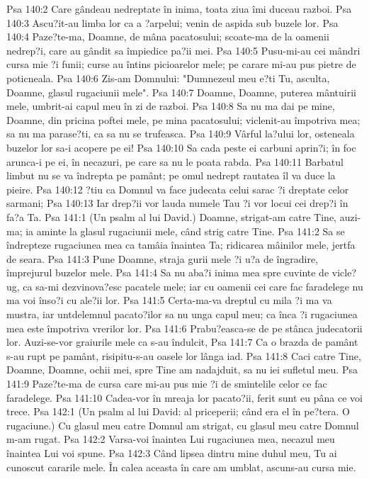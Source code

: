 Psa 140:2  Care gândeau nedreptate în inima, toata ziua îmi duceau razboi.
Psa 140:3  Ascu?it-au limba lor ca a ?arpelui; venin de aspida sub buzele lor.
Psa 140:4  Paze?te-ma, Doamne, de mâna pacatosului; scoate-ma de la oamenii nedrep?i, care au gândit sa împiedice pa?ii mei.
Psa 140:5  Pusu-mi-au cei mândri cursa mie ?i funii; curse au întins picioarelor mele; pe carare mi-au pus pietre de poticneala.
Psa 140:6  Zis-am Domnului: "Dumnezeul meu e?ti Tu, asculta, Doamne, glasul rugaciunii mele".
Psa 140:7  Doamne, Doamne, puterea mântuirii mele, umbrit-ai capul meu în zi de razboi.
Psa 140:8  Sa nu ma dai pe mine, Doamne, din pricina poftei mele, pe mina pacatosului; viclenit-au împotriva mea; sa nu ma parase?ti, ca sa nu se trufeasca.
Psa 140:9  Vârful la?ului lor, osteneala buzelor lor sa-i acopere pe ei!
Psa 140:10  Sa cada peste ei carbuni aprin?i; în foc arunca-i pe ei, în necazuri, pe care sa nu le poata rabda.
Psa 140:11  Barbatul limbut nu se va îndrepta pe pamânt; pe omul nedrept rautatea îl va duce la pieire.
Psa 140:12  ?tiu ca Domnul va face judecata celui sarac ?i dreptate celor sarmani;
Psa 140:13  Iar drep?ii vor lauda numele Tau ?i vor locui cei drep?i în fa?a Ta.
Psa 141:1  (Un psalm al lui David.) Doamne, strigat-am catre Tine, auzi-ma; ia aminte la glasul rugaciunii mele, când strig catre Tine.
Psa 141:2  Sa se îndrepteze rugaciunea mea ca tamâia înaintea Ta; ridicarea mâinilor mele, jertfa de seara.
Psa 141:3  Pune Doamne, straja gurii mele ?i u?a de îngradire, împrejurul buzelor mele.
Psa 141:4  Sa nu aba?i inima mea spre cuvinte de vicle?ug, ca sa-mi dezvinova?esc pacatele mele; iar cu oamenii cei care fac faradelege nu ma voi înso?i cu ale?ii lor.
Psa 141:5  Certa-ma-va dreptul cu mila ?i ma va mustra, iar untdelemnul pacato?ilor sa nu unga capul meu; ca înca ?i rugaciunea mea este împotriva vrerilor lor.
Psa 141:6  Prabu?easca-se de pe stânca judecatorii lor. Auzi-se-vor graiurile mele ca s-au îndulcit,
Psa 141:7  Ca o brazda de pamânt s-au rupt pe pamânt, risipitu-s-au oasele lor lânga iad.
Psa 141:8  Caci catre Tine, Doamne, Doamne, ochii mei, spre Tine am nadajduit, sa nu iei sufletul meu.
Psa 141:9  Paze?te-ma de cursa care mi-au pus mie ?i de smintelile celor ce fac faradelege.
Psa 141:10  Cadea-vor în mreaja lor pacato?ii, ferit sunt eu pâna ce voi trece.
Psa 142:1  (Un psalm al lui David: al priceperii; când era el în pe?tera. O rugaciune.) Cu glasul meu catre Domnul am strigat, cu glasul meu catre Domnul m-am rugat.
Psa 142:2  Varsa-voi înaintea Lui rugaciunea mea, necazul meu înaintea Lui voi spune.
Psa 142:3  Când lipsea dintru mine duhul meu, Tu ai cunoscut cararile mele. În calea aceasta în care am umblat, ascuns-au cursa mie.
